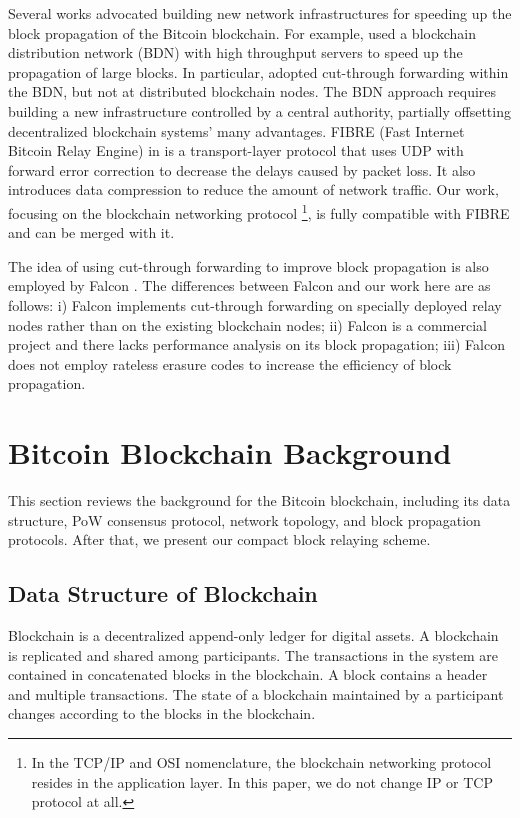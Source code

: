 \documentclass[10pt,journal,compsoc]{IEEEtran}
\begin{document}
Several works advocated building new network infrastructures for speeding up the block propagation of the Bitcoin blockchain. For example, \cite{klarman2018bloxroute} used a blockchain distribution network (BDN) with high throughput servers to speed up the propagation of large blocks. In particular, \cite{klarman2018bloxroute} adopted cut-through forwarding within the BDN, but not at distributed blockchain nodes. The BDN approach requires building a new infrastructure controlled by a central authority, partially offsetting decentralized blockchain systems' many advantages. FIBRE (Fast Internet Bitcoin Relay Engine) in \cite{corallo2017fibre} is a transport-layer protocol that uses UDP with forward error correction to decrease the delays caused by packet loss. It also introduces data compression to reduce the amount of network traffic. Our work, focusing on the blockchain networking protocol \footnote{In the TCP/IP and OSI nomenclature, the blockchain networking protocol resides in the application layer. In this paper, we do not change IP or TCP protocol at all.}, is fully compatible with FIBRE and can be merged with it.

The idea of using cut-through forwarding to improve block propagation is also employed by Falcon \cite{falcon}. The differences between Falcon and our work here are as follows: i) Falcon implements cut-through forwarding on specially deployed relay nodes rather than on the existing blockchain nodes; ii) Falcon is a commercial project and there lacks performance analysis on its block propagation; iii) Falcon does not employ rateless erasure codes to increase the efficiency of block propagation. 

\section{Bitcoin Blockchain Background}\label{section:background}
This section reviews the background for the Bitcoin blockchain, including its data structure, PoW consensus protocol, network topology, and block propagation protocols. After that, we present our compact block relaying scheme. 

\subsection{Data Structure of Blockchain}
Blockchain is a decentralized append-only ledger for digital assets. A blockchain is replicated and shared among participants. The transactions in the system are contained in concatenated blocks in the blockchain. A block contains a header and multiple transactions. The state of a blockchain maintained by a participant changes according to the blocks in the blockchain. 
\end{document}
